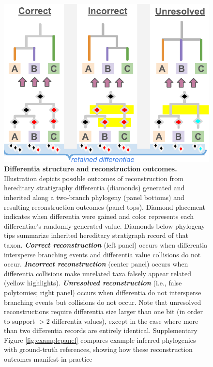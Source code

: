\begin{figure}
  \centering
  \includegraphics[width=\linewidth]{img/hstrat-failure-modes}
  \caption{%
    \textbf{Differentia structure and reconstruction outcomes.}
    \footnotesize
    Illustration depicts possible outcomes of reconstruction from hereditary stratigraphy differentia (diamonds) generated and inherited along a two-branch phylogeny (panel bottoms) and resulting reconstruction outcomes (panel tops).
    Diamond placement indicates when differentia were gained and color represents each differentiae's randomly-generated value.
    Diamonds below phylogeny tips summarize inherited hereditary stratigraph record of that taxon.
    \textbf{\textit{Correct reconstruction}} (left panel) occurs when differentia intersperse branching events and differentia value collisions do not occur.
    \textbf{\textit{Incorrect reconstruction}} (center panel) occurs when differentia collisions make unrelated taxa falsely appear related (yellow highlights).
    \textbf{\textit{Unresolved reconstruction}} (i.e., false polytomies; right panel) occurs when differentia do not intersperse branching events but collisions do not occur.
    Note that unresolved reconstructions require differentia size larger than one bit (in order to support $>2$ differentia values), except in the case where more than two differentia records are entirely identical.
    Supplementary Figure \ref{fig:examplepanel} compares example inferred phylogenies with ground-truth references, showing how these reconstruction outcomes manifest in practice \citep{moreno2024supplemental}
  }
  \label{fig:hstrat-failure-modes}
\end{figure}
